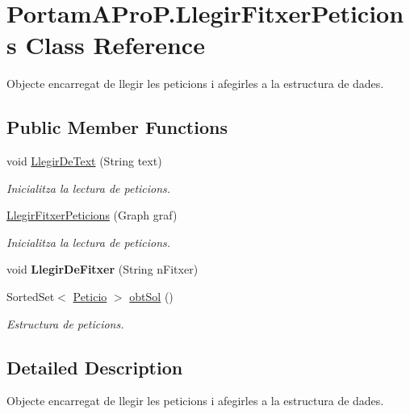 \hypertarget{class_portam_a_pro_p_1_1_llegir_fitxer_peticions}{}\section{Portam\+A\+Pro\+P.\+Llegir\+Fitxer\+Peticions Class Reference}
\label{class_portam_a_pro_p_1_1_llegir_fitxer_peticions}


Objecte encarregat de llegir les peticions i afegirles a la estructura de dades.  


\subsection*{Public Member Functions}
\begin{DoxyCompactItemize}
\item 
void \hyperlink{class_portam_a_pro_p_1_1_llegir_fitxer_peticions_a4b970306148005969bd843657ca08963}{Llegir\+De\+Text} (String text)
\begin{DoxyCompactList}\small\item\em Inicialitza la lectura de peticions. \end{DoxyCompactList}\item 
\hyperlink{class_portam_a_pro_p_1_1_llegir_fitxer_peticions_a84e976a837bca103e54c0d045c373600}{Llegir\+Fitxer\+Peticions} (Graph graf)
\begin{DoxyCompactList}\small\item\em Inicialitza la lectura de peticions. \end{DoxyCompactList}\item 
\mbox{\label{class_portam_a_pro_p_1_1_llegir_fitxer_peticions_a0ac0d3e56c76cbb941a4a061d3957271}} 
void {\bfseries Llegir\+De\+Fitxer} (String n\+Fitxer)
\item 
Sorted\+Set$<$ \hyperlink{class_portam_a_pro_p_1_1_peticio}{Peticio} $>$ \hyperlink{class_portam_a_pro_p_1_1_llegir_fitxer_peticions_a0009b0d3c8d0d2f9082af8a47b442e69}{obt\+Sol} ()
\begin{DoxyCompactList}\small\item\em Estructura de peticions. \end{DoxyCompactList}\end{DoxyCompactItemize}


\subsection{Detailed Description}
Objecte encarregat de llegir les peticions i afegirles a la estructura de dades. 


